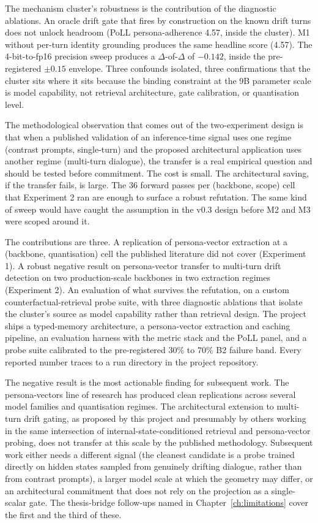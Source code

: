The mechanism cluster's robustness is the contribution of the diagnostic ablations. An oracle drift gate that fires by construction on the known drift turns does not unlock headroom (PoLL persona-adherence 4.57, inside the cluster). M1 without per-turn identity grounding produces the same headline score (4.57). The 4-bit-to-fp16 precision sweep produces a $\Delta$-of-$\Delta$ of $-0.142$, inside the pre-registered $\pm 0.15$ envelope. Three confounds isolated, three confirmations that the cluster sits where it sits because the binding constraint at the 9B parameter scale is model capability, not retrieval architecture, gate calibration, or quantisation level.

The methodological observation that comes out of the two-experiment design is that when a published validation of an inference-time signal uses one regime (contrast prompts, single-turn) and the proposed architectural application uses another regime (multi-turn dialogue), the transfer is a real empirical question and should be tested before commitment. The cost is small. The architectural saving, if the transfer fails, is large. The 36 forward passes per (backbone, scope) cell that Experiment 2 ran are enough to surface a robust refutation. The same kind of sweep would have caught the assumption in the v0.3 design before M2 and M3 were scoped around it.

The contributions are three. A replication of persona-vector extraction at a (backbone, quantisation) cell the published literature did not cover (Experiment 1). A robust negative result on persona-vector transfer to multi-turn drift detection on two production-scale backbones in two extraction regimes (Experiment 2). An evaluation of what survives the refutation, on a custom counterfactual-retrieval probe suite, with three diagnostic ablations that isolate the cluster's source as model capability rather than retrieval design. The project ships a typed-memory architecture, a persona-vector extraction and caching pipeline, an evaluation harness with the metric stack and the PoLL panel, and a probe suite calibrated to the pre-registered $30\%$ to $70\%$ B2 failure band. Every reported number traces to a run directory in the project repository.

The negative result is the most actionable finding for subsequent work. The persona-vectors line of research has produced clean replications across several model families and quantisation regimes. The architectural extension to multi-turn drift gating, as proposed by this project and presumably by others working in the same intersection of internal-state-conditioned retrieval and persona-vector probing, does not transfer at this scale by the published methodology. Subsequent work either needs a different signal (the cleanest candidate is a probe trained directly on hidden states sampled from genuinely drifting dialogue, rather than from contrast prompts), a larger model scale at which the geometry may differ, or an architectural commitment that does not rely on the projection as a single-scalar gate. The thesis-bridge follow-ups named in Chapter~\ref{ch:limitations} cover the first and the third of these.

